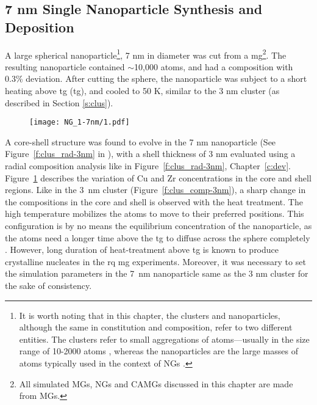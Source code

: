 \subsection{7 nm \cz Single Nanoparticle Synthesis and Deposition}
A large spherical nanoparticle\footnote{It is worth noting that in this chapter, the clusters and nanoparticles, although the same in constitution and composition, refer to two different entities. The clusters refer to small aggregations of atoms---usually in the size range of 10-2000 atoms \cite{Kartouzian2013,Kartouzian2014,Benel2018,Benel2019,Gack2020}, whereas the nanoparticles are the large masses of atoms typically used in the context of NGs \cite{Jing1989,Nandam2017,Adjaoud2016,Adjaoud2018}.}, 7 nm in diameter was cut from a \cz {} \gls{mg}\footnote{All simulated MGs, NGs and CAMGs discussed in this chapter are made from \cz {} MGs.}. The resulting nanoparticle contained $\sim$10,000 atoms, and had a \cz composition with 0.3\% deviation. After cutting the sphere, the nanoparticle was subject to a short heating above \glsdesc{tg} (\gls{tg}), and cooled to 50 K, similar to the 3 nm cluster (as described in Section \ref{s:clus}). \par

\begin{figure}[!h] \centering
	\texttt{[image: NG\_1-7nm/1.pdf]}
	\label{f:7nm-clus}
\end{figure}

\clearpage

A core-shell structure was found to evolve in the 7 nm nanoparticle (See Figure~\ref{f:clus_rad-3nm} in ), with a shell thickness of 3 nm evaluated using a radial composition analysis like in Figure~\ref{f:clus_rad-3nm}, Chapter~\ref{c:dev}. Figure~\ref{f:7nm-clus} describes the variation of Cu and Zr concentrations in the core and shell regions. Like in the \mbox{3 nm} cluster (Figure~\ref{f:clus_comp-3nm}), a sharp change in the compositions in the core and shell is observed with the heat treatment. The high temperature mobilizes the atoms to move to their preferred positions. This configuration is by no means the equilibrium concentration of the nanoparticle, as the atoms need a longer time above the \gls{tg} to diffuse across the sphere completely \cite{Adjaoud2016}. However, long duration of heat-treatment above \gls{tg} is known to produce crystalline nucleates in the \gls{rq} \gls{mg} experiments. Moreover, it was necessary to set the simulation parameters in the \mbox{7 nm} nanoparticle same as the 3 nm cluster for the sake of consistency. \par

